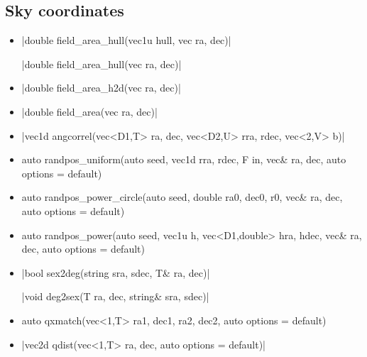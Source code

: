 \documentclass[12pt]{report}
\newcommand*\circled[1]{\tikz[baseline=(char.base)]{
            \node[shape=circle,draw,inner sep=0.0pt] (char) {#1};}}
\newcommand{\vectorfuncsym}{\circled{$\hspace{-1pt}\mathcal{V}$}\xspace}
\newcommand{\vectorfunc}{\vectorfuncsym\hspace{2pt}\xspace}
\begin{document}
\subsection{Sky coordinates}

\begin{itemize}
\item \cppinline|double field_area_hull(vec1u hull, vec ra, dec)| 

\cppinline|double field_area_hull(vec ra, dec)|

\item \cppinline|double field_area_h2d(vec ra, dec)| 

\item \cppinline|double field_area(vec ra, dec)| 

\item \cppinline|vec1d angcorrel(vec<D1,T> ra, dec, vec<D2,U> rra, rdec, vec<2,V> b)| 

\item {} \begin{cppcode}
auto randpos_uniform(auto seed, vec1d rra, rdec, F in,
                     vec& ra, dec, auto options = default)
\end{cppcode}

\item {} \begin{cppcode}
auto randpos_power_circle(auto seed, double ra0, dec0, r0,
                          vec& ra, dec, auto options = default)
\end{cppcode}

\item {} \begin{cppcode}
auto randpos_power(auto seed, vec1u h, vec<D1,double> hra, hdec,
                   vec& ra, dec, auto options = default)
\end{cppcode}

\item \vectorfunc \cppinline|bool sex2deg(string sra, sdec, T& ra, dec)| 

\vectorfunc \cppinline|void deg2sex(T ra, dec, string& sra, sdec)| 

\item {} \begin{cppcode}
auto qxmatch(vec<1,T> ra1, dec1, ra2, dec2,
             auto options = default)
\end{cppcode}

\item \cppinline|vec2d qdist(vec<1,T> ra, dec, auto options = default)| 
\end{itemize}
\end{document}
